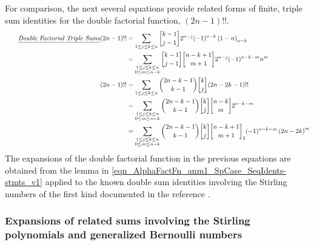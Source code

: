 \documentclass[12pt,reqno]{article}
\numberwithin{sfootnote}{section}
\numberwithin{equation}{section}
\newcommand{\tagtext}[1]{\tag*{\underline{\textit{#1}}}}
\theoremstyle{plain}
\theoremstyle{definition}
\theoremstyle{remark}
\newcommand{\gkpSI}[2]{\ensuremath{\genfrac{\lbrack}{\rbrack}{0pt}{}{#1}{#2}}}
\newcommand{\FcfII}[3]{\ensuremath{\gkpSI{#2}{#3}_{#1}}}
\newcommand{\Pochhammer}[2]{\ensuremath{\left(#1\right)_{#2}}}
\begin{document}
For comparison, the next several equations provide 
related forms of finite, triple sum identities for the 
double factorial function, $(2n-1)!!$. 
\begin{align*} 
\notag 
\tagtext{Double Factorial Triple Sums} 
(2n-1)!! 
   & = 
     \sum\limits_{1 \leq j \leq k \leq n} 
     \gkpSI{k-1}{j-1} 2^{n-j} (-1)^{n-k} \Pochhammer{1-n}{n-k} \\ 
   & = 
     \sum\limits_{\substack{1 \leq j \leq k \leq n \\ 0 \leq m \leq n-k}} 
     \gkpSI{k-1}{j-1} \gkpSI{n-k+1}{m+1} 2^{n-j} (-1)^{n-k-m} n^{m} \\ 
(2n-1)!!   
   & = 
     \sum\limits_{1 \leq j \leq k \leq n} 
     \binom{2n-k-1}{k-1} \gkpSI{k}{j} 
     (2n-2k-1)!! \\ 
   & = 
     \sum\limits_{\substack{1 \leq j \leq k \leq n \\ 0 \leq m \leq n-k}} 
     \binom{2n-k-1}{k-1} \gkpSI{k}{j} \gkpSI{n-k}{m} 2^{n-k-m} \\ 
   & = 
     \sum\limits_{\substack{1 \leq j \leq k \leq n \\ 0 \leq m \leq n-k}} 
     \binom{2n-k-1}{k-1} \gkpSI{k}{j} \FcfII{2}{n-k+1}{m+1} 
     (-1)^{n-k-m} \left(2n - 2k\right)^{m} 
\end{align*} 
The expansions of the double factorial function in the previous 
equations are obtained from the lemma in 
\eqref{eqn_AlphaFactFn_anm1_SpCase_SeqIdents-stmts_v1} 
applied to the known double sum identities involving the 
Stirling numbers of the first kind 
documented in the reference 
\citep[\S 6]{DBLFACTFN-COMBIDENTS-SURVEY}. 

\subsubsection{Expansions of related sums involving the 
               Stirling polynomials and 
               generalized Bernoulli numbers} 
\label{subsubSection_S1TripleSums_GenSPolyExps} 
\end{document}
